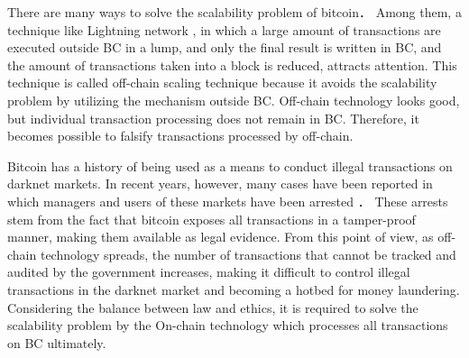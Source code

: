 \documentclass[graybox]{svmult}
\begin{document}
There are many ways to solve the scalability problem of bitcoin\cite{ZHZB2020,Fujihara2018,Fujihara2019,Fujihara2020,YF2021a,YF2021b}．
Among them, a technique like Lightning network \cite{PD2016}, in which a large amount of transactions are executed outside BC in a lump, and only the final result is written in BC, and the amount of transactions taken into a block is reduced, attracts attention.
This technique is called off-chain scaling technique because it avoids the scalability problem by utilizing the mechanism outside BC.
Off-chain technology looks good, but individual transaction processing does not remain in BC.
Therefore, it becomes possible to falsify transactions processed by off-chain.


Bitcoin has a history of being used as a means to conduct illegal transactions on darknet markets.
In recent years, however, many cases have been reported in which managers and users of these markets have been arrested \cite{silkroad,alphabay,welcome2video}．
These arrests stem from the fact that bitcoin exposes all transactions in a tamper-proof manner, making them available as legal evidence.
From this point of view, as off-chain technology spreads, the number of transactions that cannot be tracked and audited by the government increases, making it difficult to control illegal transactions in the darknet market and becoming a hotbed for money laundering.
Considering the balance between law and ethics, it is required to solve the scalability problem by the On-chain technology which processes all transactions on BC ultimately.
\end{document}
